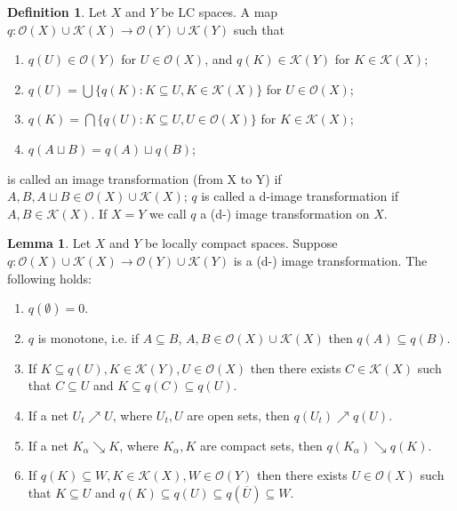\documentclass[sn-mathphys-num]{sn-jnl}%
\theoremstyle{thmstyleone}%
\theoremstyle{definition}
\newtheorem{lemma}[theorem]{Lemma}
\newtheorem{definition}[theorem]{Definition}
\begin{document}
\begin{definition} \label{IT}
Let $X$ and $Y$ be LC spaces.
A map $q: \mathscr{O}(X) \cup \mathscr{K}(X) \longrightarrow \mathscr{O}(Y)  \cup  \mathscr{K}(Y)$ such that
\begin{enumerate}[label=(IT\arabic*),ref=(IT\arabic*)]
\item \label{IT1}
$q(U) \in \mathscr{O}(Y)$  for $ U  \in \mathscr{O}(X)$, and $ q(K) \in  \mathscr{K}(Y)$ for $ K \in\mathscr{K}(X)$;
\item \label{IT3}
$q(U) =  \bigcup \{q(K): K \subseteq U, K \in \mathscr{K}(X) \}$ for $ U \in \mathscr{O}(X)$; 
\item \label{IT4}
$ q(K) = \bigcap \{ q(U): K \subseteq U, U \in \mathscr{O}(X) \}$ for $K \in \mathscr{K}(X)$;
\item \label{IT2} 
$q( A \sqcup B)  = q(A) \sqcup q(B)$;   
\end{enumerate}
is called an image transformation (from X to Y) if  $A, B, A\sqcup B \in \mathscr{O}(X) \cup \mathscr{K}(X)$; 
$q$ is called a d-image transformation if $A, B \in \mathscr{K}(X)$.
If $X = Y$ we call $q$ a (d-) image transformation on $X$.
\end{definition}

\begin{lemma} \label{ITsvva}
Let $X$ and $Y$ be locally compact spaces.
Suppose $q: \mathscr{O}(X) \cup \mathscr{K}(X) \longrightarrow \mathscr{O}(Y)  \cup  \mathscr{K}(Y)$ is a (d-) image transformation. 
The following holds:  
\begin{enumerate}[leftmargin=0.25in, label=(\roman*),ref=(\roman*)]
\item \label{ITsv0}
$q(\emptyset) = 0$.
\item \label{ITsv1}
$q$ is  monotone, i.e. if $ A \subseteq B$, $A, B \in  \mathscr{O}(X) \cup \mathscr{K}(X) $  then $ q(A) \subseteq q(B)$.
\item \label{ITsv2}
If $ K \subseteq q(U), K \in  \mathscr{K}(Y), U \in \mathscr{O}(X)$ then there exists $ C \in \mathscr{K}(X)$ 
such that $ C \subseteq U$ and $ K \subseteq q(C) \subseteq q(U)$.
\item \label{ITsv3}
If a net $ U_{t} \nearrow U $, where $U_t, U$ are open sets, then $q(U_{t}) \nearrow q(U)$.
\item \label{ITsv4}
If a net $K_{\alpha} \searrow K$, where $ K_{\alpha},  K$ are compact sets, then $q(K_{\alpha}) \searrow q(K)$.
\item \label{ITsv5}
If  $q(K) \subseteq W, K \in \mathscr{K}(X), W \in  \mathscr{O}(Y)$ then there exists $U \in \mathscr{O}(X)$ 
such that $ K \subseteq U$ and $ q(K) \subseteq q(U) \subseteq q(\overline U) \subseteq W$.
\end{enumerate}
\end{lemma} 
\end{document}
